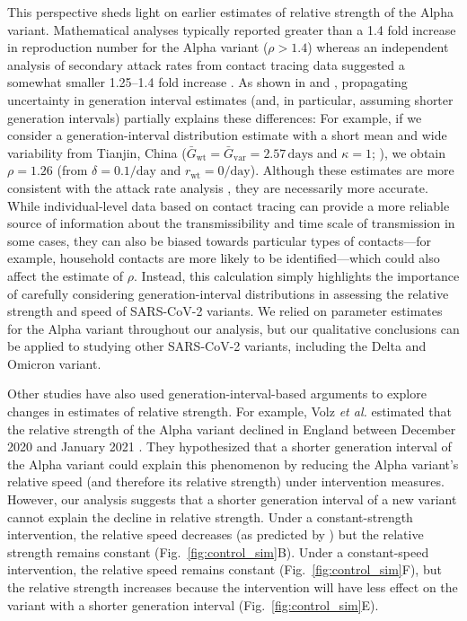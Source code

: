 \documentclass[12pt]{article}
\newcommand{\fref}[1]{Fig.~\ref{fig:#1}}
\newcommand{\vvvar}{\mathrm{var}}
\newcommand{\wwwt}{\mathrm{wt}}
\newcommand{\rx}[1]{\ensuremath{{r}_{#1}}\xspace}
\newcommand{\rw}{\rx{\wwwt}}
\newcommand{\days}{\ensuremath{\, \textrm{days}}}
\newcommand{\pday}{\ensuremath{/\textrm{day}}}
\newcommand{\Gx}[1]{\ensuremath{{\bar G}_{#1}}\xspace}
\newcommand{\Gw}{\Gx{\wwwt}}
\newcommand{\Gv}{\Gx{\vvvar}}
\begin{document}
This perspective sheds light on earlier estimates of relative strength of the Alpha variant.
Mathematical analyses typically reported greater than a 1.4 fold increase in reproduction number for the Alpha variant ($\rho > 1.4$) whereas an independent analysis of secondary attack rates from contact tracing data suggested a somewhat smaller 1.25--1.4 fold increase \citep{ukinvest}.
As shown in \cite{davies2021estimated} and \cite{volz2021transmission}, propagating uncertainty in generation interval estimates (and, in particular, assuming shorter generation intervals) partially explains these differences:
For example, if we consider a generation-interval distribution estimate with a short mean and wide variability from Tianjin, China ($\Gw=\Gv=2.57\days$ and $\kappa=1$; \cite{ganyani2020estimating}), we obtain $\rho=1.26$ (from $\delta=0.1\pday$ and $\rw = 0\pday$).
Although these estimates are more consistent with the attack rate analysis \citep{ukinvest}, they are necessarily more accurate.
While individual-level data based on contact tracing can provide a more reliable source of information about the transmissibility and time scale of transmission in some cases, they can also be biased towards particular types of contacts---for example, household contacts are more likely to be identified---which could also affect the estimate of $\rho$.
Instead, this calculation simply highlights the importance of carefully considering generation-interval distributions in assessing the relative strength and speed of SARS-CoV-2 variants.
We relied on parameter estimates for the Alpha variant throughout our analysis, but our qualitative conclusions can be applied to studying other SARS-CoV-2 variants, including the Delta and Omicron  variant.

Other studies have also used generation-interval-based arguments to explore changes in estimates of relative strength. 
For example, Volz \textit{et al.} estimated that the relative strength of the Alpha variant declined in England between December 2020 and January 2021 \cite{volz2021transmission}.
They hypothesized that a shorter generation interval of the Alpha variant could explain this phenomenon by reducing the Alpha variant's relative speed (and therefore its relative strength) under intervention measures.
However, our analysis suggests that a shorter generation interval of a new variant cannot explain the decline in relative strength.
Under a constant-strength intervention, the relative speed decreases (as predicted by  \cite{volz2021transmission}) but the relative strength remains constant (\fref{control_sim}B). 
Under a constant-speed intervention, the relative speed remains constant (\fref{control_sim}F), but the relative strength increases because the intervention will have less effect on the variant with a shorter generation interval (\fref{control_sim}E).
\end{document}

